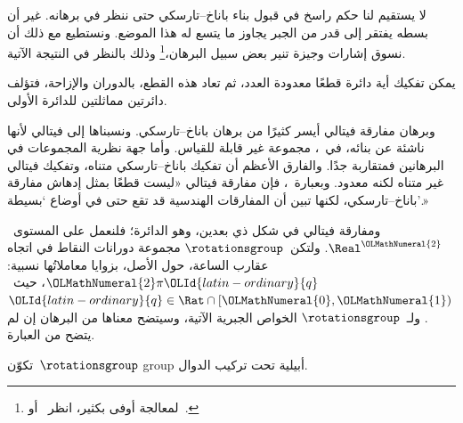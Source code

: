 \documentclass[../../../include/open-logic-section]{subfiles}
\begin{document}

لا يستقيم لنا حكم راسخ في قبول بناء باناخ--تارسكي حتى ننظر في برهانه.
غير أن بسطه يفتقر إلى قدر من الجبر يجاوز ما يتسع له هذا الموضع. ونستطيع
مع ذلك أن نسوق إشارات وجيزة تنير بعض سبيل البرهان،\footnote{لمعالجة
أوفى بكثير، انظر~\cite{Weston2003} أو~\cite{Wagon2016}.} وذلك بالنظر
في النتيجة الآتية.

\begin{thm}
يمكن تفكيك أية دائرة قطعًا معدودة العدد، ثم تعاد هذه القطع، بالدوران
والإزاحة، فتؤلف دائرتين مماثلتين للدائرة الأولى.
\end{thm}

وبرهان مفارقة فيتالي أيسر كثيرًا من برهان باناخ--تارسكي. ونسبناها إلى
فيتالي لأنها ناشئة عن بنائه، في~\citeyear{Vitali1905}، مجموعة غير
قابلة للقياس. وأما جهة نظرية المجموعات في البرهانين فمتقاربة جدًا.
والفارق الأعظم أن تفكيك باناخ--تارسكي متناه، وتفكيك فيتالي غير متناه
لكنه معدود. وبعبارة~\citet{Weston2003}، فإن مفارقة فيتالي «ليست
قطعًا بمثل إدهاش مفارقة باناخ--تارسكي، لكنها تبين أن المفارقات
الهندسية قد تقع حتى في أوضاع `بسيطة'.»

ومفارقة فيتالي في شكل ذي بعدين، وهو الدائرة؛ فلنعمل على
المستوى~$\Real^{\OLMathNumeral{2}}$. ولتكن~$\rotationsgroup$ مجموعة دورانات النقاط في
اتجاه عقارب الساعة، حول الأصل، بزوايا معاملاتُها نسبية:
${\OLMathNumeral{2}}\pi {\OLId{latin-ordinary}{q}}$، حيث~${\OLId{latin-ordinary}{q}} \in \Rat \cap [{\OLMathNumeral{0}},{\OLMathNumeral{1}})$. ولـ~$\rotationsgroup$ الخواص
الجبرية الآتية، وسيتضح معناها من البرهان إن لم يتضح من العبارة.

\begin{lem}
تكوّن~$\rotationsgroup$ {group} أبيلية تحت تركيب الدوال.
\end{lem}
\end{document}
